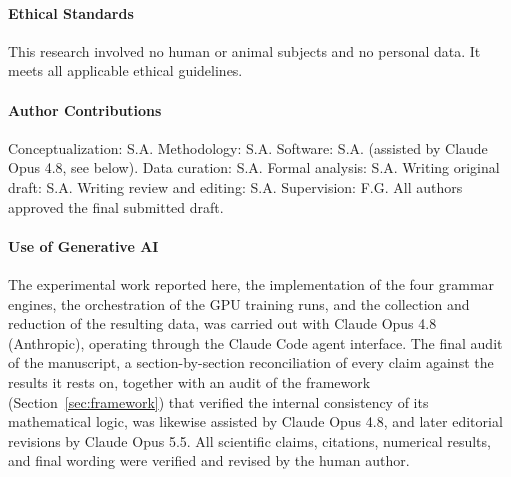 \documentclass[
  journal=nlp,
  manuscript=article-type,
  year=2026,
  volume=1,
]{cup-journal}
\begin{document}
\paragraph{Ethical Standards}
This research involved no human or animal subjects and no personal data. It meets all applicable ethical guidelines.

\paragraph{Author Contributions}
Conceptualization: S.A. Methodology: S.A. Software: S.A. (assisted by Claude Opus 4.8, see below). Data curation: S.A. Formal analysis: S.A. Writing original draft: S.A. Writing review and editing: S.A. Supervision: F.G. All authors approved the final submitted draft.

\paragraph{Use of Generative AI}
The experimental work reported here, the implementation of the four grammar engines, the orchestration of the GPU training runs, and the collection and reduction of the resulting data, was carried out with Claude Opus 4.8 (Anthropic), operating through the Claude Code agent interface. The final audit of the manuscript, a section-by-section reconciliation of every claim against the results it rests on, together with an audit of the framework (Section~\ref{sec:framework}) that verified the internal consistency of its mathematical logic, was likewise assisted by Claude Opus 4.8, and later editorial revisions by Claude Opus 5.5. All scientific claims, citations, numerical results, and final wording were verified and revised by the human author.
\endgroup

\printbibliography
\end{document}
